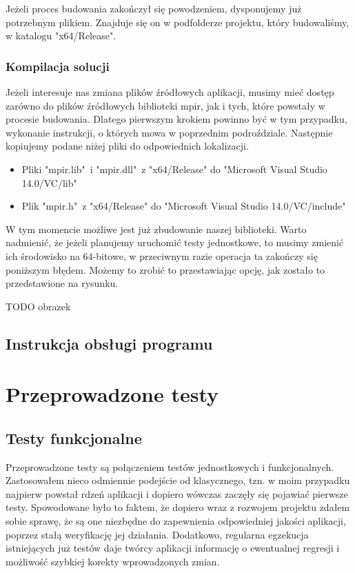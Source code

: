 \documentclass[oneside,a4paper]{book}
\begin{document}
	Jeżeli proces budowania zakończył się powodzeniem, dysponujemy już potrzebnym plikiem. Znajduje się on w podfolderze projektu, który budowaliśmy, w katalogu "x64/Release".
	
	\subsection{Kompilacja solucji}
	
	Jeżeli interesuje nas zmiana plików źródłowych aplikacji, musimy mieć dostęp zarówno do plików źródłowych biblioteki mpir, jak i tych, które powstały w procesie budowania. Dlatego pierwszym krokiem powinno być w tym przypadku, wykonanie instrukcji, o których mowa w poprzednim podroździale. Następnie kopiujemy podane niżej pliki do odpowiednich lokalizacji.
	
	\begin{itemize}
		\item Pliki "mpir.lib"\ i "mpir.dll"\ z "x64/Release" do "Microsoft Visual Studio 14.0/VC/lib"
		\item Plik "mpir.h"\ z "x64/Release" do "Microsoft Visual Studio 14.0/VC/include"
	\end{itemize}
	
	W tym momencie możliwe jest już zbudowanie naszej biblioteki. Warto nadmienić, że jeżeli planujemy uruchomić testy jednostkowe, to musimy zmienić ich środowisko na 64-bitowe, w przeciwnym razie operacja ta zakończy się poniższym błędem. Możemy to zrobić to przestawiając opcję, jak zostało to przedstawione na rysunku.
	
	TODO obrazek	
	
	\section{Instrukcja obsługi programu}
	
	\chapter{Przeprowadzone testy}
	
	\section{Testy funkcjonalne}
	
	Przeprowadzone testy są połączeniem testów jednostkowych i funkcjonalnych. Zastosowałem nieco odmiennie podejście od klasycznego, tzn. w moim przypadku najpierw powstał rdzeń aplikacji i dopiero wówczas zaczęły się pojawiać pierwsze testy. Spowodowane było to faktem, że dopiero wraz z rozwojem projektu zdałem sobie sprawę, że są one niezbędne do zapewnienia odpowiedniej jakości aplikacji, poprzez stałą weryfikację jej działania. Dodatkowo, regularna egzekucja istniejących już testów daje twórcy aplikacji informację o ewentualnej regresji i możliwość szybkiej korekty wprowadzonych zmian.
	
\end{document}

